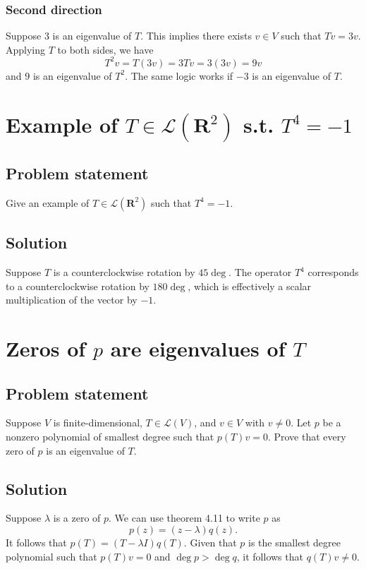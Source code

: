 \documentclass{article}
\begin{document}
\subsubsection*{Second direction}
Suppose $3$ is an eigenvalue of $T$. 
This implies there exists $v\in V$ such that $Tv=3v$. 
Applying $T$ to both sides, we have
\[T^2v=T(3v)=3Tv=3(3v)=9v\]
and $9$ is an eigenvalue of $T^2$. 
The same logic works if $-3$ is an eigenvalue of $T$.

\clearpage

\section{Example of $T\in\mathcal{L}(\mathbf{R}^2)$ s.t. $T^4=-1$}
\subsection*{Problem statement}
Give an example of $T\in\mathcal{L}(\mathbf{R}^2)$ such that $T^4=-1$.

\subsection*{Solution}
Suppose $T$ is a counterclockwise rotation by $45\deg$. 
The operator $T^4$ corresponds to a counterclockwise rotation by $180\deg$, which is effectively a scalar multiplication of the vector by $-1$.

\clearpage

\section{Zeros of $p$ are eigenvalues of $T$}
\subsection*{Problem statement}
Suppose $V$ is finite-dimensional, $T\in \mathcal{L}(V)$, and $v\in V$ with $v\neq 0$. 
Let $p$ be a nonzero polynomial of smallest degree such that $p(T)v=0$. 
Prove that every zero of $p$ is an eigenvalue of $T$.

\subsection*{Solution}
Suppose $\lambda$ is a zero of $p$. 
We can use theorem 4.11 to write $p$ as 
\[p(z)=(z-\lambda)q(z).\] 
It follows that $p(T)=(T-\lambda I)q(T)$. 
Given that $p$ is the smallest degree polynomial such that $p(T)v=0$ and $\operatorname{deg}p>\operatorname{deg}q$, it follows that $q(T)v\neq 0$. 
\end{document}
